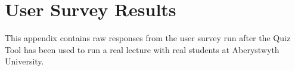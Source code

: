 \chapter{User Survey Results}
\label{chap:usersurvey}

This appendix contains raw responses from the user survey run after the Quiz
Tool has been used to run a real lecture with real students at Aberystwyth University.
